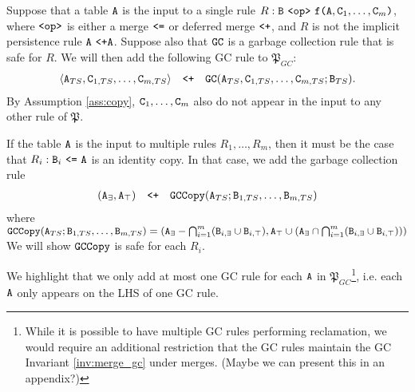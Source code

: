 \documentclass{article}
\numberwithin{equation}{section}
\renewcommand{\tt}[1]{\ifmmode\text{\texttt{#1}}\else\texttt{#1}\fi}
\begin{document}
Suppose that a table $\tt{A}$ is the input to a single rule $R: \tt{B} ~\tt{<op>}~ \tt{f}\tt{(}\tt{A},\tt{C}_1,\dots,\tt{C}_m\tt{)}$, where $\tt{<op>}$ is either a merge $\tt{<=}$ or deferred merge $\tt{<+}$, and $R$ is not the implicit persistence rule $\tt{A} ~\tt{<+} \tt{A}$.
Suppose also that $\tt{GC}$ is a garbage collection rule that is safe for $R$.
We will then add the following GC rule to $\mathfrak{P}_{GC}$:
\begin{align}
\langle \tt{A}_{TS}, \tt{C}_{1,TS}, \dots, \tt{C}_{m,TS} \rangle
\quad\tt{<+}\quad
\tt{GC}(\tt{A}_{TS}, \tt{C}_{1,TS}, \dots, \tt{C}_{m,TS}; \tt{B}_{TS}).
\end{align}
By Assumption \ref{ass:copy}, $\tt{C}_1,\dots,\tt{C}_m$ also do not appear in the input to any other rule of $\mathfrak{P}$.

If the table $\tt{A}$ is the input to multiple rules $R_1, \dots, R_m$, then it must be the case that $R_i: \tt{B}_i ~\tt{<=}~ \tt{A}$ is an identity copy.
In that case, we add the garbage collection rule
\begin{align}
(\tt{A}_\exists, \tt{A}_\top) \quad\tt{<+}\quad \tt{GCCopy}(\tt{A}_{TS}; \tt{B}_{1,TS}, \dots, \tt{B}_{m,TS})
\end{align}
where $\tt{GCCopy}(\tt{A}_{TS}; \tt{B}_{1,TS}, \dots, \tt{B}_{m,TS}) = \left(\tt{A}_\exists - \bigcap_{i=1}^m (\tt{B}_{i,\exists} \cup \tt{B}_{i,\top}), \tt{A}_\top \cup \left(\tt{A}_\exists \cap \bigcap_{i=1}^m (\tt{B}_{i,\exists} \cup \tt{B}_{i,\top})\right)\right)$
We will show $\tt{GCCopy}$ is safe for each $R_i$.

We highlight that we only add at most one GC rule for each $\tt{A}$ in $\mathfrak{P}_{GC}$\footnote{
While it is possible to have multiple GC rules performing reclamation, we would require an additional restriction that the GC rules maintain the GC Invariant \ref{inv:merge_gc} under merges.
(Maybe we can present this in an appendix?)
}, i.e. each $\tt{A}$ only appears on the LHS of one GC rule.
\end{document}
